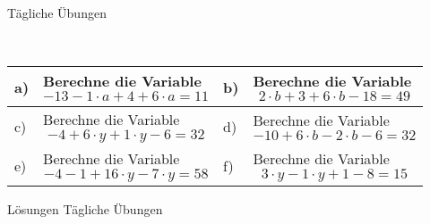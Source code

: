 \documentclass[12pt]{article}
\begin{document}
\centerline{{\Large Tägliche Übungen}} 
\vspace{1cm}
\noindent \\


\begin{xltabular}{\textwidth}{|C{0.75cm}|X|C{0.75cm}|X|}
\hline
a)&Berechne die Variable $$-13-1\cdot a+4+6\cdot a=11$$
&
b)&Berechne die Variable $$2\cdot b+3+6\cdot b-18=49$$
\\\hline
c)&Berechne die Variable $$-4+6\cdot y+1\cdot y-6=32$$
&
d)&Berechne die Variable $$-10+6\cdot b-2\cdot b-6=32$$
\\\hline
e)&Berechne die Variable $$-4-1+16\cdot y-7\cdot y=58$$
&
f)&Berechne die Variable $$3\cdot y-1\cdot y+1-8=15$$
\\\hline
\end{xltabular}
\vspace{0.5cm}
\newpage
{}
\centerline{{\large Lösungen Tägliche Übungen}} 
\vspace{0.5cm}
\end{document}
